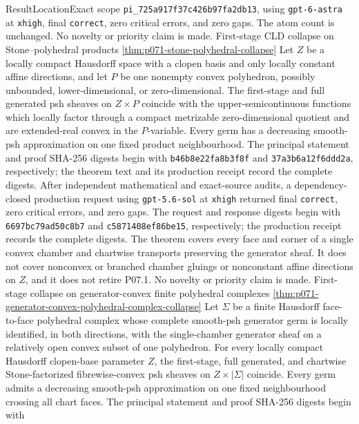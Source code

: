 \begin{AppLProvenanceLedger}{Result}{Location}{Exact scope}
{   \nolinkurl{pi_725a917f37c426b97fa2db13}, using
   \texttt{gpt-6-astra} at \texttt{xhigh}, final \texttt{correct}, zero
   critical errors, and zero gaps.  The atom count is unchanged.  No
   novelty or priority claim is made.}
\AppLProvenanceRecord
  {First-stage CLD collapse on Stone--polyhedral products}
  {\cref{thm:p071-stone-polyhedral-collapse}}
  {Let \(Z\) be a locally compact Hausdorff space with a clopen basis and
   only locally constant affine directions, and let \(P\) be one nonempty
   convex polyhedron, possibly unbounded, lower-dimensional, or
   zero-dimensional.  The first-stage and full generated psh sheaves on
   \(Z\times P\) coincide with the upper-semicontinuous functions which
   locally factor through a compact metrizable zero-dimensional quotient
   and are extended-real convex in the \(P\)-variable.  Every germ has a
   decreasing smooth-psh approximation on one fixed product neighbourhood.
   The principal statement and proof SHA-256 digests begin with
   \texttt{b46b8e22fa8b3f8f} and
   \texttt{37a3b6a12f6ddd2a}, respectively; the theorem text and its
   production receipt record the complete digests.
   After independent mathematical and exact-source audits, a
   dependency-closed production request using \texttt{gpt-5.6-sol} at
   \texttt{xhigh} returned final \texttt{correct}, zero critical errors,
   and zero gaps.  The request and response digests begin with
   \texttt{6697bc79ad50c8b7} and
   \texttt{c5871408ef86be15}, respectively; the production receipt records
   the complete digests.
   The theorem covers every face and corner of a single convex chamber and
   chartwise transports preserving the generator sheaf.  It does not cover
   nonconvex or branched chamber gluings or nonconstant affine directions
   on \(Z\), and it does not retire P07.1.  No novelty or priority claim is
   made.}
\AppLProvenanceRecord
  {First-stage collapse on generator-convex finite polyhedral complexes}
  {\cref{thm:p071-generator-convex-polyhedral-complex-collapse}}
  {Let \(\Sigma\) be a finite Hausdorff face-to-face polyhedral complex
   whose complete smooth-psh generator germ is locally identified, in both
   directions, with the single-chamber generator sheaf on a relatively open
   convex subset of one polyhedron.  For every locally compact Hausdorff
   clopen-base parameter \(Z\), the first-stage, full generated, and
   chartwise Stone-factorized fibrewise-convex psh sheaves on
   \(Z\times|\Sigma|\) coincide.  Every germ admits a decreasing
   smooth-psh approximation on one fixed neighbourhood crossing all chart
   faces.  The principal statement and proof SHA-256 digests begin with
}
\end{AppLProvenanceLedger}
